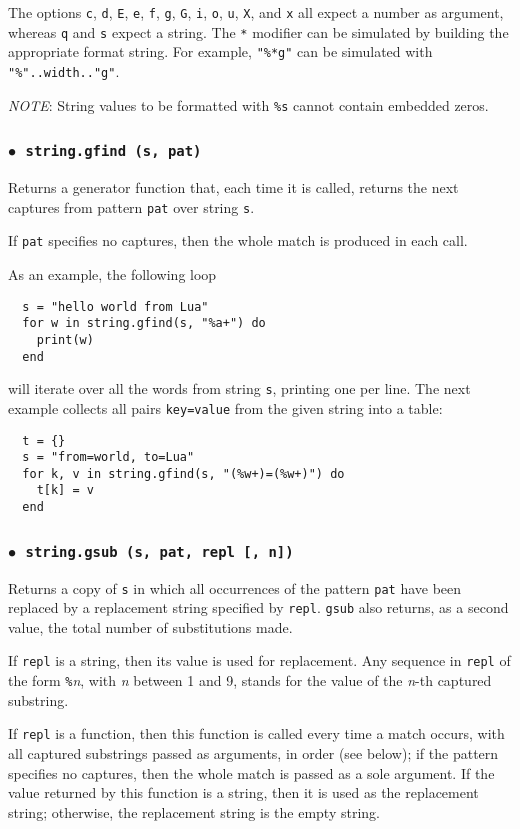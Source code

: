\documentclass[11pt,twoside]{article}
\makeatletter
\newcommand{\M}[1]{{\rm\emph{#1}}}
\newcommand{\T}[1]{{\tt #1}}
\newcommand{\DefLIB}[1]{\index{#1@{\tt #1}}}
\newcommand{\ff}{$\bullet$\ }
\newcommand{\NOTE}{\par\medskip\noindent\emph{NOTE}: }
\makeatother
\begin{document}
The options \verb|c|, \verb|d|, \verb|E|, \verb|e|, \verb|f|,
\verb|g|, \verb|G|, \verb|i|, \verb|o|, \verb|u|, \verb|X|, and \verb|x| all
expect a number as argument,
whereas \verb|q| and \verb|s| expect a string.
The \verb|*| modifier can be simulated by building
the appropriate format string.
For example, \verb|"%*g"| can be simulated with
\verb|"%"..width.."g"|.

\NOTE
String values to be formatted with
\verb|%s| cannot contain embedded zeros.

\subsubsection*{\ff \T{string.gfind (s, pat)}}

Returns a generator function that,
each time it is called,
returns the next captures from pattern \verb|pat| over string \verb|s|.

If \verb|pat| specifies no captures,
then the whole match is produced in each call.

As an example, the following loop
\begin{verbatim}
  s = "hello world from Lua"
  for w in string.gfind(s, "%a+") do
    print(w)
  end
\end{verbatim}
will iterate over all the words from string \verb|s|,
printing one per line.
The next example collects all pairs \verb|key=value| from the
given string into a table:
\begin{verbatim}
  t = {}
  s = "from=world, to=Lua"
  for k, v in string.gfind(s, "(%w+)=(%w+)") do
    t[k] = v
  end
\end{verbatim}

\subsubsection*{\ff \T{string.gsub (s, pat, repl [, n])}}
\DefLIB{string.gsub}
Returns a copy of \verb|s|
in which all occurrences of the pattern \verb|pat| have been
replaced by a replacement string specified by \verb|repl|.
\verb|gsub| also returns, as a second value,
the total number of substitutions made.

If \verb|repl| is a string, then its value is used for replacement.
Any sequence in \verb|repl| of the form \verb|%|\M{n},
with \M{n} between 1 and 9,
stands for the value of the \M{n}-th captured substring.

If \verb|repl| is a function, then this function is called every time a
match occurs, with all captured substrings passed as arguments,
in order (see below);
if the pattern specifies no captures,
then the whole match is passed as a sole argument.
If the value returned by this function is a string,
then it is used as the replacement string;
otherwise, the replacement string is the empty string.
\end{document}
